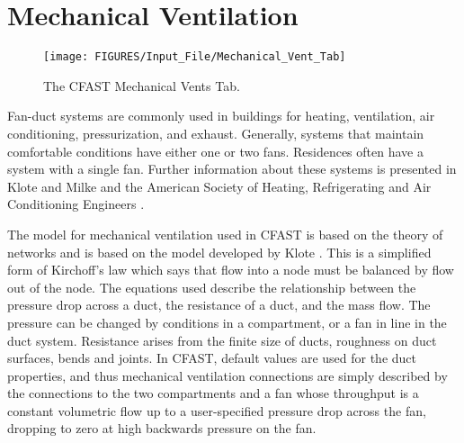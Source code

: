 




\chapter{Mechanical Ventilation}

\begin{figure}[h!]
\begin{center}
\texttt{[image: FIGURES/Input\_File/Mechanical\_Vent\_Tab]}
\caption[The CFAST Mechanical Vents Tab]{The CFAST Mechanical Vents Tab.}
\end{center}
\end{figure}

Fan-duct systems are commonly used in buildings for heating, ventilation, air conditioning, pressurization, and exhaust. Generally, systems that maintain comfortable conditions have either one or two fans.  Residences often have a system with a single fan. Further information about these systems is presented in  Klote and Milke \cite{Klote:2002} and the American Society of Heating, Refrigerating and Air Conditioning Engineers \cite{ASHRAE:2001}.

The model for mechanical ventilation used in CFAST is based on the theory of networks and is based on the model developed by Klote \cite{Klote:1988a}.  This is a simplified form of Kirchoff's law which says that flow into a node must be balanced by flow out of the node. The equations used describe the relationship between the pressure drop across a duct, the resistance of a duct, and the mass flow.  The pressure can be changed by conditions in a compartment, or a fan in line in the duct system.  Resistance arises from the finite size of ducts, roughness on duct surfaces, bends and joints. In CFAST, default values are used for the duct properties, and thus mechanical ventilation connections are simply described by the connections to the two compartments and a fan whose throughput is a constant volumetric flow up to a user-specified pressure drop across the fan, dropping to zero at high backwards pressure on the fan.

